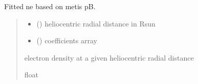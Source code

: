 \documentclass[letterpaper,10pt,english]{sphinxmanual}
\begin{document}
\begin{fulllineitems}
\label{\detokenize{doppler_dimming_lib:doppler_dimming_lib.metis.Ne_exponential_fit}}
\pysigstartsignatures
{}
\pysigstopsignatures
\sphinxAtStartPar
Fitted ne based on metis pB.
\begin{quote}\begin{description}
\begin{itemize}
\item {} 
\sphinxAtStartPar
{} () \textendash{} heliocentric radial distance in Rsun

\item {} 
\sphinxAtStartPar
{} () \textendash{} coefficients array

\end{itemize}

\sphinxAtStartPar
electron density at a given heliocentric radial distance

\sphinxAtStartPar
float

\end{description}\end{quote}

\end{fulllineitems}


\begin{fulllineitems}
\label{\detokenize{doppler_dimming_lib:doppler_dimming_lib.metis.Te_pos_from_ne}}
\pysigstartsignatures
{}
\pysigstopsignatures
\end{fulllineitems}

\end{document}
